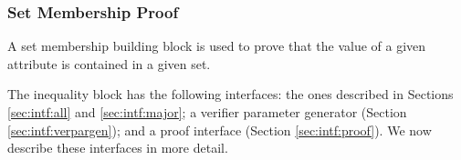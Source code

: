 
    \subsubsection{Set Membership Proof}
     \notimplemented

    A set membership building block is used to prove that the value of a given attribute
    is contained in a given set.

    The inequality block has the following interfaces:
    the ones described in Sections \ref{sec:intf:all} and \ref{sec:intf:major};
    a verifier parameter generator (Section \ref{sec:intf:verpargen});
    and a proof interface (Section \ref{sec:intf:proof}).
      We now describe these interfaces in more detail.


